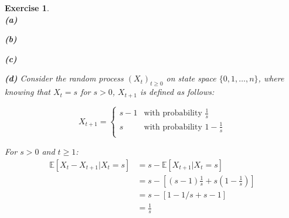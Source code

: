 \documentclass{article}
\newtheorem{exo}{Exercise}
\def\E{\mathbb{E}}
\begin{document}
\begin{exo}{\ \\}
\noindent
\textbf{(a)}

\noindent
\textbf{(b)} 

\noindent
\textbf{(c)}  

\noindent
\textbf{(d)} Consider the random process $(X_t)_{t \geq 0}$ on state space $\{0, 1, \dots, n\}$, where knowing that $X_t = s$ for $s>0$, $X_{t+1}$ is defined as follows:

\[   
X_{t+1} = 
\begin{cases}
    s-1 &\text{with probability } \frac{1}{s} \\
    s   &\text{with probability } 1 - \frac{1}{s}\\
\end{cases}
\]

For $s>0$ and $t \geq 1$:
\begin{align*}
    \E[X_{t}-X_{t+1}|X_t=s] 
    &= s - \E[X_{t+1}| X_t=s] \\
    &= s - [(s-1)\frac{1}{s} + s(1-\frac{1}{s})] \\
    &= s - [1 - 1/s + s -1] \\
    &= \frac{1}{s} 
\end{align*}


\end{exo}
\end{document}
